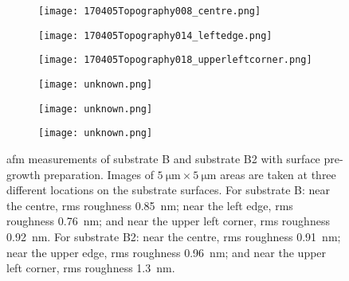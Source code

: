 \begin{figure}[htbp]
    \centering
    \begin{subfigure}[t]{0.3\linewidth}
    \centering
        \texttt{[image: 170405Topography008\_centre.png]}
        \caption{}\label{fig:subBb_afm_centre}%
    \end{subfigure}%
    \hfill
    \begin{subfigure}[t]{0.3\linewidth}
    \centering
        \texttt{[image: 170405Topography014\_leftedge.png]}
        \caption{}\label{fig:subBb_afm_edge}%
    \end{subfigure}%
    \hfill
    \begin{subfigure}[t]{0.3\linewidth}
    \centering
        \texttt{[image: 170405Topography018\_upperleftcorner.png]}
        \caption{}\label{fig:subBb_afm_corner} %
    \end{subfigure}%
    \par\bigskip
    \begin{subfigure}[t]{0.3\linewidth}
    \centering
        \texttt{[image: unknown.png]}
        \caption{}\label{fig:subB2b_afm_centre}
    \end{subfigure}%
    \hfill
    \begin{subfigure}[t]{0.3\linewidth}
    \centering
        \texttt{[image: unknown.png]}
        \caption{}\label{fig:subB2b_afm_edge}
    \end{subfigure}%
    \hfill
    \begin{subfigure}[t]{0.3\linewidth}
    \centering
        \texttt{[image: unknown.png]}
        \caption{}\label{fig:subB2b_afm_corner} 
    \end{subfigure}%
    \caption[\Ac{afm} of substrate B and substrate B2 with surface pre-growth preparation.]{\Acf{afm} measurements of substrate B and substrate B2 with surface pre-growth preparation. Images of $\SI{5}{\micro\metre}\times\SI{5}{\micro\metre}$ areas are taken at three different locations on the substrate surfaces. For substrate B:  near the centre, \ac{rms} roughness \SI{0.85}{\nano\metre};  near the left edge, \ac{rms} roughness \SI{0.76}{\nano\metre}; and  near the upper left corner, \ac{rms} roughness \SI{0.92}{\nano\metre}. For substrate B2:  near the centre, \ac{rms} roughness \SI{0.91}{\nano\metre};  near the upper edge, \ac{rms} roughness \SI{0.96}{\nano\metre}; and  near the upper left corner, \ac{rms} roughness \SI{1.3}{\nano\metre}.}\label{fig:subBb_and_subB2_afm}
\end{figure} %

